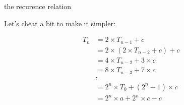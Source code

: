 \begin{frame}{the recurence relation}

  Let's cheat a bit to make it simpler:

  \vspace{5pt}\pause

    \begin{equation}  
  \begin{split}
T_n & = 2 \times T_{n-1} + c \\
    & = 2 \times ( 2 \times T_{n-2} + c ) + c \\
    & = 4 \times T_{n-2} + 3 \times c \\
    & = 8 \times T_{n-3} + 7 \times c\\
    & : \\
    & = 2^n \times T_0 +  (2^n -1) \times c \\
    & = 2^n \times a +  2^n \times c  - c\\
  \end{split}
\end{equation}

\vspace{5pt}


\end{frame}



